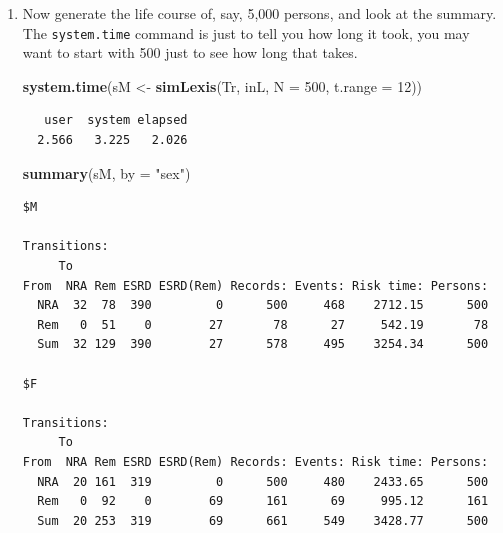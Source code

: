 \documentclass[
]{book}
\newenvironment{Shaded}{\begin{snugshade}}{\end{snugshade}}
\newcommand{\AttributeTok}[1]{\textcolor[rgb]{0.13,0.29,0.53}{#1}}
\newcommand{\DecValTok}[1]{\textcolor[rgb]{0.00,0.00,0.81}{#1}}
\newcommand{\FunctionTok}[1]{\textcolor[rgb]{0.13,0.29,0.53}{\textbf{#1}}}
\newcommand{\NormalTok}[1]{#1}
\newcommand{\OtherTok}[1]{\textcolor[rgb]{0.56,0.35,0.01}{#1}}
\newcommand{\StringTok}[1]{\textcolor[rgb]{0.31,0.60,0.02}{#1}}
\theoremstyle{definition}
\theoremstyle{definition}
\theoremstyle{definition}
\theoremstyle{definition}
\theoremstyle{remark}
\begin{document}
\begin{enumerate}
\begin{verbatim}
$F

Transitions:
     To
From  NRA Rem ESRD ESRD(Rem) Records: Events: Risk time: Persons:
  NRA   0   1    9         0       10      10      41.40       10
  Rem   0   0    0         1        1       1       7.42        1
  Sum   0   1    9         1       11      11      48.82       10
\end{verbatim}

  What type of object have you got as \texttt{iL}?
\item
  Now generate the life course of, say, 5,000 persons, and look at the summary.
  The \texttt{system.time} command is just to tell you how long it
  took, you may want to start with 500 just to see how long that takes.

\begin{Shaded}
\begin{Highlighting}[]
\FunctionTok{system.time}\NormalTok{(sM }\OtherTok{\textless{}{-}} \FunctionTok{simLexis}\NormalTok{(Tr, inL, }\AttributeTok{N =} \DecValTok{500}\NormalTok{, }\AttributeTok{t.range =} \DecValTok{12}\NormalTok{))}
\end{Highlighting}
\end{Shaded}

\begin{verbatim}
   user  system elapsed 
  2.566   3.225   2.026 
\end{verbatim}

\begin{Shaded}
\begin{Highlighting}[]
\FunctionTok{summary}\NormalTok{(sM, }\AttributeTok{by =} \StringTok{"sex"}\NormalTok{)}
\end{Highlighting}
\end{Shaded}

\begin{verbatim}
$M

Transitions:
     To
From  NRA Rem ESRD ESRD(Rem) Records: Events: Risk time: Persons:
  NRA  32  78  390         0      500     468    2712.15      500
  Rem   0  51    0        27       78      27     542.19       78
  Sum  32 129  390        27      578     495    3254.34      500

$F

Transitions:
     To
From  NRA Rem ESRD ESRD(Rem) Records: Events: Risk time: Persons:
  NRA  20 161  319         0      500     480    2433.65      500
  Rem   0  92    0        69      161      69     995.12      161
  Sum  20 253  319        69      661     549    3428.77      500
\end{verbatim}


\end{enumerate}
\end{document}
